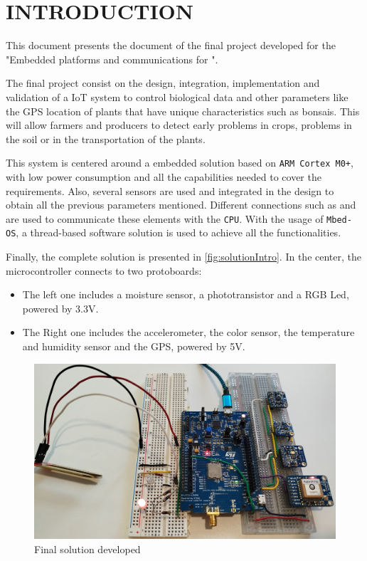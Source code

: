 \section{INTRODUCTION}
This document presents the document of the final project developed for the "Embedded platforms and communications for ".

The final project consist on the design, integration, implementation and validation of a IoT system to control biological data and other parameters like the GPS location of plants that have unique characteristics such as bonsais. This will allow farmers and 
producers to detect early problems in crops, problems in the soil or in the transportation of the plants. 

This system is centered around a embedded solution based on \texttt{ARM Cortex M0+}, with low power consumption and all the capabilities needed to cover the requirements. Also, several sensors are used and integrated in the design to obtain all the previous parameters mentioned. Different connections 
such as \texttt{} and \texttt{} are used to communicate these elements with the \texttt{CPU}. With the usage of \texttt{Mbed-OS}, a thread-based software 
solution is used to achieve all the functionalities.

Finally, the complete solution is presented in \autoref{fig:solutionIntro}. In the center, the microcontroller connects to two protoboards:
\begin{itemize}
    \item The left one includes a moisture sensor, a phototransistor and a RGB Led, powered by 3.3V.
    \item The Right one includes the accelerometer, the color sensor, the temperature and humidity sensor and the GPS, powered by 5V.
\end{itemize}

\begin{figure}[H]
    \centering
    \includegraphics[width=1\textwidth]{images/1/sistema.png}
    \caption{Final solution developed}
    \label{fig:solutionIntro}
\end{figure}